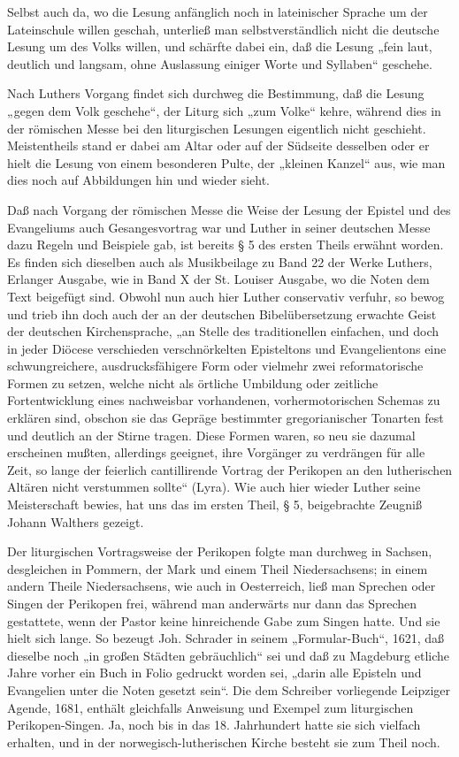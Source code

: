 Selbst auch da, wo die Lesung anfänglich noch in lateinischer Sprache um der Lateinschule willen geschah, unterließ man selbstverständlich nicht die deutsche Lesung um des Volks willen, und schärfte dabei ein, daß die Lesung „fein laut, deutlich und langsam, ohne Auslassung einiger Worte und Syllaben“ geschehe.

Nach Luthers Vorgang findet sich durchweg die Bestimmung, daß die Lesung „gegen dem Volk geschehe“, der Liturg sich „zum Volke“ kehre, während dies in der römischen Messe bei den liturgischen Lesungen eigentlich nicht geschieht. Meistentheils stand er dabei am Altar oder auf der Südseite desselben oder er hielt die Lesung von einem besonderen Pulte, der „kleinen Kanzel“ aus, wie man dies noch auf Abbildungen hin und wieder sieht.

Daß nach Vorgang der römischen Messe die Weise der Lesung der Epistel und des Evangeliums auch Gesangesvortrag war und Luther in seiner deutschen Messe dazu Regeln und Beispiele gab, ist bereits § 5 des ersten Theils erwähnt worden. Es finden sich dieselben auch als Musikbeilage zu Band 22 der Werke Luthers, Erlanger Ausgabe, wie in Band X der St. Louiser Ausgabe, wo die Noten dem Text beigefügt sind. Obwohl nun auch hier Luther conservativ verfuhr, so bewog und trieb ihn doch auch der an der deutschen Bibelübersetzung erwachte Geist der deutschen Kirchensprache, „an Stelle des traditionellen einfachen, und doch in jeder Diöcese verschieden verschnörkelten Episteltons und Evangelientons eine schwungreichere, ausdrucksfähigere Form oder vielmehr zwei reformatorische Formen zu setzen, welche nicht als örtliche Umbildung oder zeitliche Fortentwicklung eines nachweisbar vorhandenen, vorhermotorischen
Schemas zu erklären sind, obschon sie das Gepräge bestimmter gregorianischer Tonarten fest und deutlich an der Stirne tragen. Diese Formen waren, so neu sie dazumal erscheinen mußten, allerdings geeignet, ihre Vorgänger zu verdrängen für alle Zeit, so lange der feierlich cantillirende Vortrag der Perikopen an den lutherischen Altären nicht verstummen sollte“ (Lyra). Wie auch hier wieder Luther seine Meisterschaft bewies, hat uns das im ersten Theil, § 5, beigebrachte Zeugniß Johann Walthers gezeigt.

Der liturgischen Vortragsweise der Perikopen folgte man durchweg in Sachsen, desgleichen in Pommern, der Mark und einem Theil Niedersachsens; in einem andern Theile Niedersachsens, wie auch in Oesterreich, ließ man Sprechen oder Singen der Perikopen frei, während man anderwärts nur dann das Sprechen gestattete, wenn der Pastor keine hinreichende Gabe zum Singen hatte. Und sie hielt sich lange. So bezeugt Joh. Schrader in seinem „Formular-Buch“, 1621, daß dieselbe noch „in großen Städten gebräuchlich“ sei und daß zu Magdeburg etliche Jahre vorher ein Buch in Folio gedruckt worden sei, „darin alle Episteln und Evangelien unter die Noten gesetzt sein“. Die dem Schreiber vorliegende Leipziger Agende, 1681, enthält gleichfalls Anweisung und Exempel zum liturgischen Perikopen-Singen. Ja, noch bis in das 18. Jahrhundert hatte sie sich vielfach erhalten, und in der norwegisch-lutherischen Kirche besteht sie zum Theil noch.

